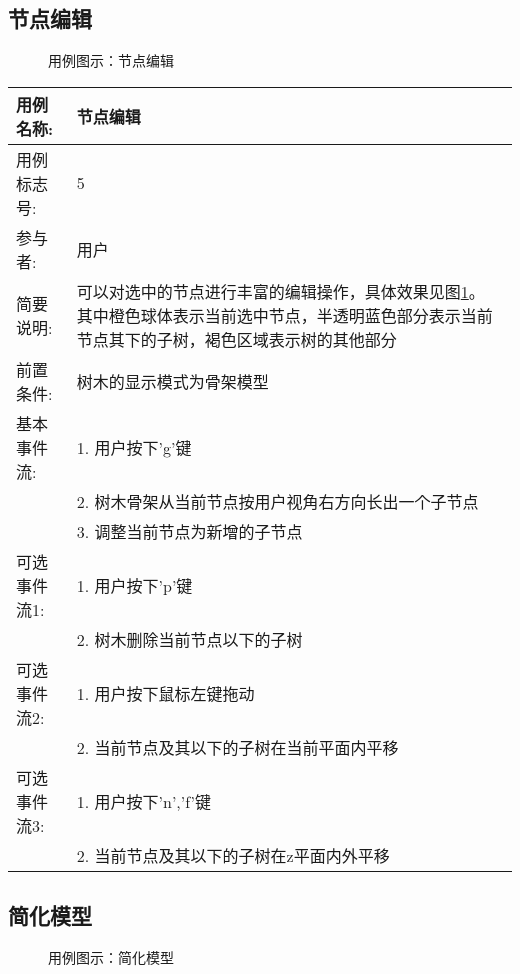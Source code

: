 \clearpage
\subsection{节点编辑}
\begin{figure}[H]
	\centering
	\hfill
	\hfill
	\hfill
	\hfill
	\hfill
	\hfill
	\caption{用例图示：节点编辑}
	\label{fig:uc5}
\end{figure}

\begin{table}[H]
	\centering
\begin{tabular}{|l|p{10cm}|}
	\hline
	用例名称: & 节点编辑\\
	\hline
	用例标志号: & 5\\
	\hline
	参与者: & 用户\\
	\hline
	简要说明: & 可以对选中的节点进行丰富的编辑操作，具体效果见图\ref{fig:uc5}。
	其中橙色球体表示当前选中节点，半透明蓝色部分表示当前节点其下的子树，褐色区域表示树的其他部分\\
	\hline
	前置条件: & 树木的显示模式为骨架模型\\
	\hline
	基本事件流: & 1. 用户按下'g'键\\
	 & 2. 树木骨架从当前节点按用户视角右方向长出一个子节点\\
	 & 3. 调整当前节点为新增的子节点\\
	\hline
	可选事件流1: & 1. 用户按下'p'键\\
	 & 2. 树木删除当前节点以下的子树\\
	\hline
	可选事件流2: & 1. 用户按下鼠标左键拖动\\
	 & 2. 当前节点及其以下的子树在当前平面内平移\\
	\hline
	可选事件流3: & 1. 用户按下'n','f'键\\
	 & 2. 当前节点及其以下的子树在z平面内外平移\\
	\hline
\end{tabular}
\end{table}

\clearpage
\subsection{简化模型}
\begin{figure}[H]
	\centering
	\hfill
	\hfill
	\caption{用例图示：简化模型}
	\label{fig:uc6}
\end{figure}

